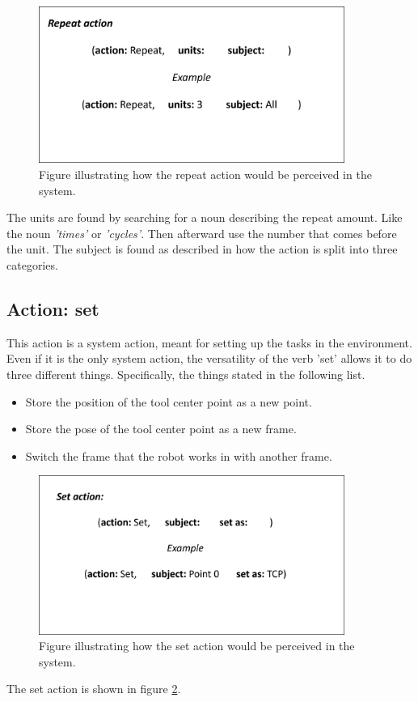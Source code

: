 \begin{figure}[ht]
    \centering
    \includegraphics[width=10cm]{img/repeat_action.png}
    \caption{Figure illustrating how the repeat action would be perceived in the system.}
    \label{fig:action_REP}
\end{figure}

The units are found by searching for a noun describing the repeat amount. Like the noun \textit{'times'} or \textit{'cycles'}. Then afterward use the number that comes before the unit. The subject is found as described in how the action is split into three categories.


\subsection{Action: set}\label{esc:action_set}
This action is a system action, meant for setting up the tasks in the environment. Even if it is the only system action, the versatility of the verb 'set' allows it to do three different things. Specifically, the things stated in the following list.

\begin{itemize}
    \item Store the position of the tool center point as a new point.
    \item Store the pose of the tool center point as a new frame.
    \item Switch the frame that the robot works in with another frame.
\end{itemize}

\begin{figure}[ht]
    \centering
    \includegraphics[width=10cm]{img/action_SET.png}
    \caption{Figure illustrating how the set action would be perceived in the system.}
    \label{fig:action_set}
\end{figure}
The set action is shown in figure \ref{fig:action_set}.

